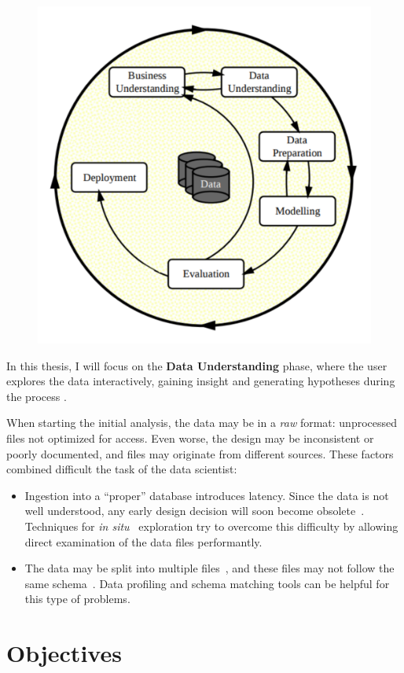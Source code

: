 \begin{figure}[htbp]
    \centering
    \includegraphics[width=0.5\linewidth]{images/introduction/crisp-dm.pdf}
    \caption{}
    \label{fig:crispdm}
\end{figure}

In this thesis, I will focus on the \textbf{Data Understanding} phase, where the user
explores the data interactively, gaining insight and generating hypotheses during the process \cite{Geer2014}.

When starting the initial analysis, the data may be in a \emph{raw} format: unprocessed files not
optimized for access. Even worse, the design may be inconsistent or poorly documented, and files may
originate from different sources. These factors combined difficult the task of the data scientist:

\begin{itemize}
    \item Ingestion into a ``proper'' database introduces latency. Since the data is not well
        understood, any early design decision will soon become obsolete~\cite{Kersten2011}.
        Techniques for \emph{in situ}~\cite{Idreos2011} exploration try to overcome this difficulty
        by allowing direct examination of the data files performantly.
    \item The data may be split into multiple files~\cite{Baud2012}, and these files may not
        follow the same schema~\cite{Alawini2014}. Data profiling and schema matching tools
        can be helpful for this type of problems.
\end{itemize}

\section{Objectives}


